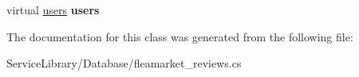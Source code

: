 \begin{DoxyCompactItemize}
\item 
\hypertarget{class_service_library_1_1_database_1_1fleamarket__reviews_a618c9484d895bf9636e75cd32e55f93e}{virtual \hyperlink{class_service_library_1_1_database_1_1users}{users} {\bfseries users}}\label{class_service_library_1_1_database_1_1fleamarket__reviews_a618c9484d895bf9636e75cd32e55f93e}

\end{DoxyCompactItemize}


The documentation for this class was generated from the following file\-:\begin{DoxyCompactItemize}
\item 
Service\-Library/\-Database/fleamarket\-\_\-reviews.\-cs\end{DoxyCompactItemize}
